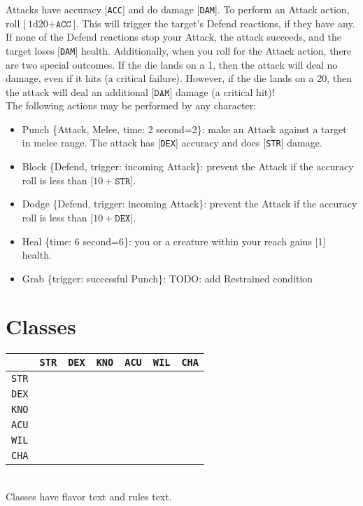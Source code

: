 \documentclass[12pt]{article}
\newcommand{\STR}{\texttt{STR}}
\newcommand{\DEX}{\texttt{DEX}}
\newcommand{\KNO}{\texttt{KNO}}
\newcommand{\ACU}{\texttt{ACU}}
\newcommand{\WIL}{\texttt{WIL}}
\newcommand{\CHA}{\texttt{CHA}}
\newcommand{\ACC}{\texttt{ACC}}
\newcommand{\DAM}{\texttt{DAM}}
\newcommand{\TIME}[1]{\{time: #1 second\if1=#1{}\else{s}\fi\}}
\newcommand{\TRIG}[1]{\{trigger: #1\}}
\newcommand{\MELEE}[1]{\{Attack, Melee, time: #1 second\if1=#1{}\else{s}\fi\}}
\newcommand{\DEFEND}{\{Defend, trigger: incoming Attack\}}
\newcommand{\dice}[2]{\text{#1d#2}}
\begin{document}
Attacks have accuracy [\ACC] and do damage [\DAM]. To perform an Attack action, roll [$\dice{1}{20} + \ACC$]. This will trigger the target’s Defend reactions, if they have any. If none of the Defend reactions stop your Attack, the attack succeeds, and the target loses [\DAM] health. Additionally, when you roll for the Attack action, there are two special outcomes. If the die lands on a 1, then the attack will deal no damage, even if it hits (a critical failure). However, if the die lands on a 20, then the attack will deal an additional [$\DAM$] damage (a critical hit)!
\\[5mm]
The following actions may be performed by any character:
\begin{itemize}

\item Punch \MELEE{2}: make an Attack against a target in melee range. The attack has [\DEX] accuracy and does [\STR] damage.

\item Block \DEFEND: prevent the Attack if the accuracy roll is less than [$10 + \STR$].

\item Dodge \DEFEND: prevent the Attack if the accuracy roll is less than [$10 + \DEX$].

\item Heal \TIME{6}: you or a creature within your reach gains [1] health.

\item Grab \TRIG{successful Punch}: TODO: add Restrained condition

\end{itemize}

\pagebreak
\section{Classes}

\begin{tabularx}{\textwidth}{c|CCCCCC}
& \STR & \DEX & \KNO & \ACU & \WIL & \CHA \\\hline
\STR &  &  &  &  &  &  \\
\DEX &  &  &  &  &  &  \\
\KNO &  &  &  &  &  &  \\
\ACU &  &  &  &  &  &   \\
\WIL &  &  &  &  &  &  \\
\CHA &  &  &  &  &  &  \\
\end{tabularx}
\\[5mm]
Classes have flavor text and rules text.
\end{document}
